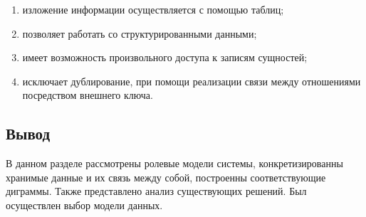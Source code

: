 \begin{enumerate}[label=\arabic*.]
	\item изложение информации осуществляется с помощью таблиц;
	\item позволяет работать со структурированными данными;
	\item имеет возможность произвольного доступа к записям сущностей;
	\item исключает дублирование, при помощи реализации связи между отношениями посредством внешнего ключа.
\end{enumerate}

\subsection*{Вывод}

В данном разделе рассмотрены ролевые модели системы, конкретизированны хранимые данные и их
связь между собой, построенны соответствующие диграммы. Также представлено анализ существующих решений.
Был осуществлен выбор модели данных.